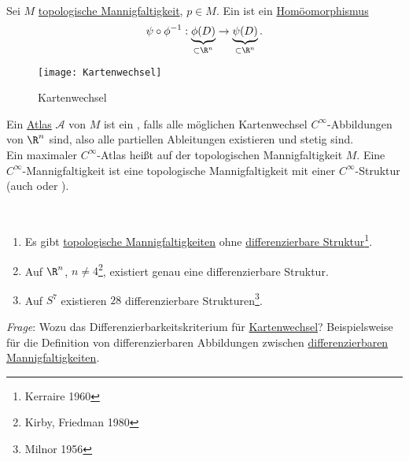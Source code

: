 \begin{definition}
  \  \\

  \begin{minipage}{.45\textwidth}
    Sei \( M \) \hyperref[def:topologischeMannigfaltigkeit]{topologische Mannigfaltigkeit}, \( p \in M \). Ein \label{def:kartenwechsel} ist ein \hyperref[def:homoeomorphismus]{Homöomorphismus}
    \begin{equation*}
      \psi \circ \phi^{-1}: \underbrace{\phi(D)}_{\subset \R^n} \to \underbrace{\psi(D)}_{\subset \R^n}\text{.}
    \end{equation*}
  \end{minipage}
  \hfill
  \begin{minipage}{.45\textwidth}
    \begin{figure}[H]
      \texttt{[image: Kartenwechsel]}
      \caption{Kartenwechsel}
    \end{figure}
  \end{minipage}
  Ein \hyperref[def:atlas]{Atlas} \( \mathcal{A} \) von \( M \) ist ein \label{def:dbatlas}, falls alle möglichen Kartenwechsel \( C^\infty \)-Abbildungen von \( \R^n \) sind, also alle partiellen Ableitungen existieren und stetig sind. \\
  Ein maximaler \( C^\infty \)-Atlas heißt \label{def:dbstruktur} auf der topologischen Mannigfaltigkeit \( M \). Eine \( C^\infty \)-Mannigfaltigkeit ist eine topologische Mannigfaltigkeit mit einer \( C^\infty \)-Struktur (auch \label{def:glattemannigfaltigkeit} oder \label{def:dbmannigfaltigkeit}).
\end{definition}

\begin{remark}
  \
  \begin{enumerate}
    \item Es gibt \hyperref[def:topologischeMannigfaltigkeit]{topologische Mannigfaltigkeiten} ohne \hyperref[def:dbstruktur]{differenzierbare Struktur}\footnote{Kerraire 1960}.
    \item Auf \( \R^n \), \( n \neq 4 \)\footnote{Kirby, Friedman 1980}, existiert genau eine differenzierbare Struktur.
    \item Auf \( S^7 \) existieren \( 28 \) differenzierbare Strukturen\footnote{Milnor 1956}.
  \end{enumerate}
  \emph{Frage}: Wozu das Differenzierbarkeitskriterium für \hyperref[def:kartenwechsel]{Kartenwechsel}? Beispielsweise für die Definition von differenzierbaren Abbildungen zwischen \hyperref[def:dbmannigfaltigkeit]{differenzierbaren Mannigfaltigkeiten}.
\end{remark}


